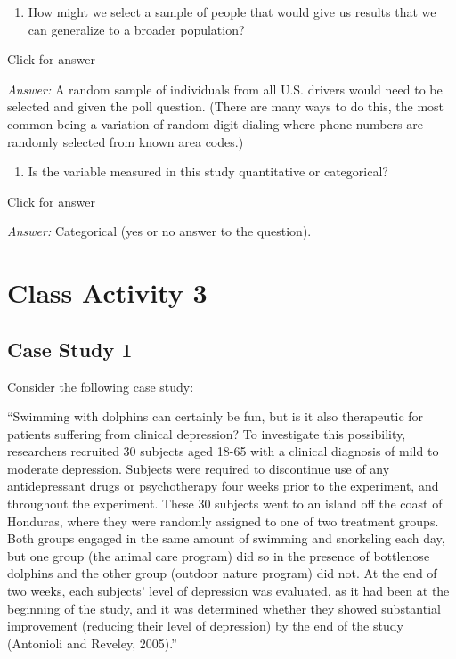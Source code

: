 \documentclass[
]{book}
\providecommand{\tightlist}{%
  \setlength{\itemsep}{0pt}\setlength{\parskip}{0pt}}
\begin{document}
\begin{enumerate}
\def\labelenumi{\alph{enumi}.}
\setcounter{enumi}{2}
\tightlist
\item
  How might we select a sample of people that would give us results that we can generalize to a broader population?
\end{enumerate}

Click for answer

\emph{Answer:} A random sample of individuals from all U.S. drivers would need to be selected and given the poll question. (There are many ways to do this, the most common being a variation of random digit dialing where phone numbers are randomly selected from known area codes.)

\begin{enumerate}
\def\labelenumi{\alph{enumi}.}
\setcounter{enumi}{3}
\tightlist
\item
  Is the variable measured in this study quantitative or categorical?
\end{enumerate}

Click for answer

\emph{Answer:} Categorical (yes or no answer to the question).

\hypertarget{class-activity-3}{%
\chapter{Class Activity 3}\label{class-activity-3}}

\hypertarget{case-study-1}{%
\section{Case Study 1}\label{case-study-1}}

Consider the following case study:

``Swimming with dolphins can certainly be fun, but is it also therapeutic for patients suffering from clinical depression? To investigate this possibility, researchers recruited 30 subjects aged 18-65 with a clinical diagnosis of mild to moderate depression. Subjects were required to discontinue use of any antidepressant drugs or psychotherapy four weeks prior to the experiment, and throughout the experiment. These 30 subjects went to an island off the coast of Honduras, where they were randomly assigned to one of two treatment groups. Both groups engaged in the same amount of swimming and snorkeling each day, but one group (the animal care program) did so in the presence of bottlenose dolphins and the other group (outdoor nature program) did not. At the end of two weeks, each subjects' level of depression was evaluated, as it had been at the beginning of the study, and it was determined whether they showed substantial improvement (reducing their level of depression) by the end of the study (Antonioli and Reveley, 2005).''
\end{document}
